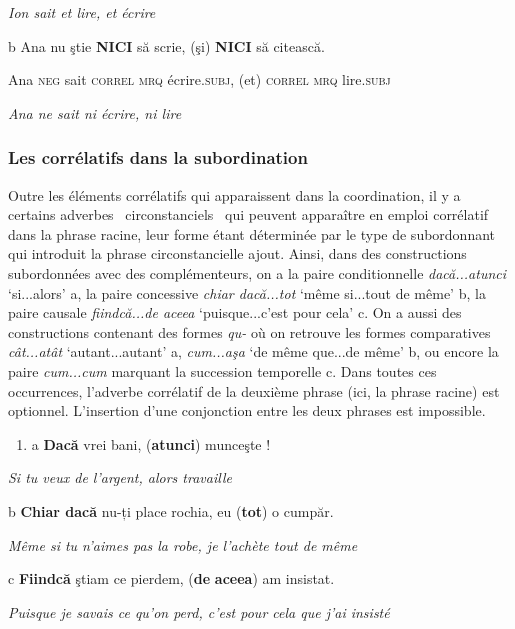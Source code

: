 {\itshape
Ion sait et lire, et écrire}

  b  Ana  nu  ştie  \textbf{NICI}  să  scrie,  (şi)  \textbf{NICI}  să  citească.

    Ana  \textsc{neg}  sait  \textsc{correl  mrq}  écrire.\textsc{subj},  (et)  \textsc{correl  mrq}  lire\textsc{.subj}

    \textit{Ana ne sait ni écrire, ni lire}  

\subsubsection{Les corrélatifs dans la subordination}
Outre les éléments corrélatifs qui apparaissent dans la coordination, il y a certains adverbes {\guillemotleft}~circonstanciels~{\guillemotright} qui peuvent apparaître en emploi corrélatif dans la phrase racine, leur forme étant déterminée par le type de subordonnant qui introduit la phrase circonstancielle ajout. Ainsi, dans des constructions subordonnées avec des complémenteurs, on a la paire conditionnelle \textit{dacă...atunci} `si...alors' a, la paire concessive \textit{chiar dacă...tot} `même si...tout de même' b, la paire causale \textit{fiindcă...de aceea} `puisque...c'est pour cela' c. On a aussi des constructions contenant des formes \textit{qu-} où on retrouve les formes comparatives \textit{cât...atât} `autant...autant' a, \textit{cum...aşa} `de même que...de même' b, ou encore la paire \textit{cum...cum} marquant la succession temporelle c. Dans toutes ces occurrences, l'adverbe corrélatif de la deuxième phrase (ici, la phrase racine) est optionnel. L'insertion d'une conjonction entre les deux phrases est impossible.


\begin{enumerate}
\item \label{bkm:Ref301515796}a  \textbf{Dacă} vrei bani, (\textbf{atunci}) munceşte !


\end{enumerate}
{\itshape
Si tu veux de l'argent, alors travaille}

  b  \textbf{Chiar dacă} nu-ți place rochia, eu (\textbf{tot}) o cumpăr.

{\itshape
Même si tu n'aimes pas la robe, je l'achète tout de même}

  c  \textbf{Fiindcă} ştiam ce pierdem, (\textbf{de} \textbf{aceea}) am insistat.

{\itshape
Puisque je savais ce qu'on perd, c'est pour cela que j'ai insisté}


